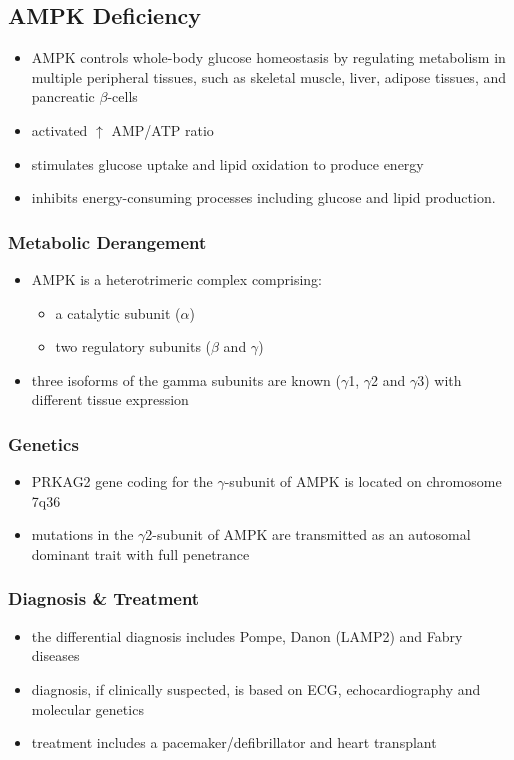\documentclass{scrartcl}
\begin{document}
\subsection{AMPK Deficiency}
\label{sec:orgfa117c0}
\begin{itemize}
\item AMPK controls whole-body glucose homeostasis by regulating metabolism in multiple peripheral tissues, such as
skeletal muscle, liver, adipose tissues, and pancreatic \(\beta\)-cells
\item activated \(\uparrow\) AMP/ATP ratio
\item stimulates glucose uptake and lipid oxidation to produce energy
\item inhibits energy-consuming processes including glucose and lipid production.
\end{itemize}

\subsubsection{Metabolic Derangement}
\label{sec:orgab0e873}
\begin{itemize}
\item AMPK is a heterotrimeric complex comprising:
\begin{itemize}
\item a catalytic subunit (\(\alpha\))
\item two regulatory subunits (\(\beta\) and \(\gamma\))
\end{itemize}
\item three isoforms of the gamma subunits are known (\(\gamma\)1, \(\gamma\)2 and \(\gamma\)3) with different tissue
expression
\end{itemize}

\subsubsection{Genetics}
\label{sec:orgd0fe39d}
\begin{itemize}
\item PRKAG2 gene coding for the \(\gamma\)-subunit of AMPK is located on chromosome 7q36
\item mutations in the \(\gamma\)2-subunit of AMPK are transmitted as an
autosomal dominant trait with full penetrance
\end{itemize}

\subsubsection{Diagnosis \& Treatment}
\label{sec:org0449168}
\begin{itemize}
\item the differential diagnosis includes Pompe, Danon (LAMP2) and Fabry diseases
\item diagnosis, if clinically suspected, is based on ECG,
echocardiography and molecular genetics
\item treatment includes a pacemaker/defibrillator and heart transplant
\end{itemize}
\end{document}
